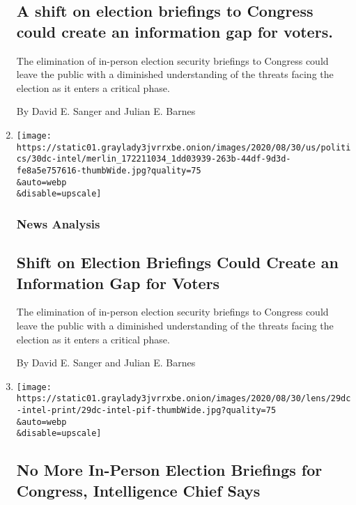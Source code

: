 \begin{enumerate}
{  \subsection{A shift on election briefings to Congress could create an
  information gap for
  voters.}\label{a-shift-on-election-briefings-to-congress-could-create-an-information-gap-for-voters}}

  The elimination of in-person election security briefings to Congress
  could leave the public with a diminished understanding of the threats
  facing the election as it enters a critical phase.

  By David E. Sanger and Julian E. Barnes
\item
  \href{/2020/08/30/us/politics/2020-election-security-briefings.html}{}

  \texttt{[image: https://static01.graylady3jvrrxbe.onion/images/2020/08/30/us/politics/30dc-intel/merlin\_172211034\_1dd03939-263b-44df-9d3d-fe8a5e757616-thumbWide.jpg?quality=75\\\&auto=webp\\\&disable=upscale]}

  \hypertarget{news-analysis}{%
  \subsubsection{News Analysis}\label{news-analysis}}

  \hypertarget{shift-on-election-briefings-could-create-an-information-gap-for-voters}{%
  \subsection{Shift on Election Briefings Could Create an Information
  Gap for
  Voters}\label{shift-on-election-briefings-could-create-an-information-gap-for-voters}}

  The elimination of in-person election security briefings to Congress
  could leave the public with a diminished understanding of the threats
  facing the election as it enters a critical phase.

  By David E. Sanger and Julian E. Barnes
\item
  \href{/2020/08/29/us/politics/election-security-intelligence-briefings-congress.html}{}

  \texttt{[image: https://static01.graylady3jvrrxbe.onion/images/2020/08/30/lens/29dc-intel-print/29dc-intel-pif-thumbWide.jpg?quality=75\\\&auto=webp\\\&disable=upscale]}

  \hypertarget{no-more-in-person-election-briefings-for-congress-intelligence-chief-says}{%
  \subsection{No More In-Person Election Briefings for Congress,
  Intelligence Chief
  Says}\label{no-more-in-person-election-briefings-for-congress-intelligence-chief-says}}


\end{enumerate}
